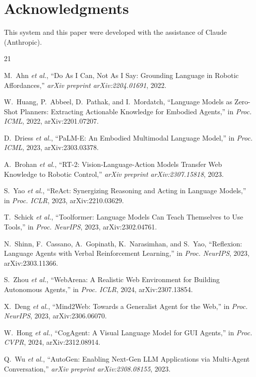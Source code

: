 \documentclass[conference]{IEEEtran}
\begin{document}
\section*{Acknowledgments}
This system and this paper were developed with the assistance of Claude (Anthropic).

\begin{thebibliography}{21}

M.~Ahn \emph{et al.}, ``Do As I Can, Not As I Say: Grounding Language in Robotic Affordances,'' \emph{arXiv preprint arXiv:2204.01691}, 2022.

W.~Huang, P.~Abbeel, D.~Pathak, and I.~Mordatch, ``Language Models as Zero-Shot Planners: Extracting Actionable Knowledge for Embodied Agents,'' in \emph{Proc. ICML}, 2022, arXiv:2201.07207.

D.~Driess \emph{et al.}, ``PaLM-E: An Embodied Multimodal Language Model,'' in \emph{Proc. ICML}, 2023, arXiv:2303.03378.

A.~Brohan \emph{et al.}, ``RT-2: Vision-Language-Action Models Transfer Web Knowledge to Robotic Control,'' \emph{arXiv preprint arXiv:2307.15818}, 2023.

S.~Yao \emph{et al.}, ``ReAct: Synergizing Reasoning and Acting in Language Models,'' in \emph{Proc. ICLR}, 2023, arXiv:2210.03629.

T.~Schick \emph{et al.}, ``Toolformer: Language Models Can Teach Themselves to Use Tools,'' in \emph{Proc. NeurIPS}, 2023, arXiv:2302.04761.

N.~Shinn, F.~Cassano, A.~Gopinath, K.~Narasimhan, and S.~Yao, ``Reflexion: Language Agents with Verbal Reinforcement Learning,'' in \emph{Proc. NeurIPS}, 2023, arXiv:2303.11366.

S.~Zhou \emph{et al.}, ``WebArena: A Realistic Web Environment for Building Autonomous Agents,'' in \emph{Proc. ICLR}, 2024, arXiv:2307.13854.

X.~Deng \emph{et al.}, ``Mind2Web: Towards a Generalist Agent for the Web,'' in \emph{Proc. NeurIPS}, 2023, arXiv:2306.06070.

W.~Hong \emph{et al.}, ``CogAgent: A Visual Language Model for GUI Agents,'' in \emph{Proc. CVPR}, 2024, arXiv:2312.08914.

Q.~Wu \emph{et al.}, ``AutoGen: Enabling Next-Gen LLM Applications via Multi-Agent Conversation,'' \emph{arXiv preprint arXiv:2308.08155}, 2023.


\end{thebibliography}
\end{document}
